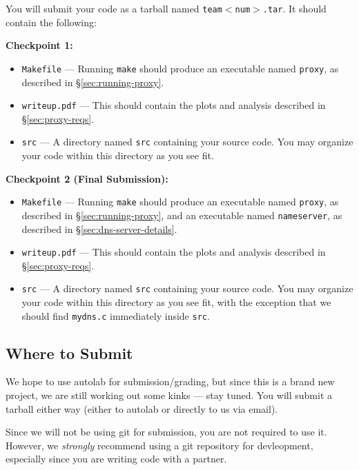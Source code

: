 \documentclass{article}
\begin{document}
You will submit your code as a tarball named \texttt{team$<$num$>$.tar}. It
should contain the following:

\medskip \noindent \textbf{Checkpoint 1:}
\begin{itemize}
	\item \texttt{Makefile} --- Running \texttt{make} should produce an
	executable named \texttt{proxy}, as described in \S\ref{sec:running-proxy}.

	\item \texttt{writeup.pdf} --- This should contain the plots and analysis
	described in \S\ref{sec:proxy-reqs}. 

	\item \texttt{src} --- A directory named \texttt{src} containing your
	source code. You may organize your code within this directory as you see
	fit.
\end{itemize}


\medskip \noindent \textbf{Checkpoint 2 (Final Submission):}
\begin{itemize}
	\item \texttt{Makefile} --- Running \texttt{make} should produce an
	executable named \texttt{proxy}, as described in \S\ref{sec:running-proxy},
	and an executable named \texttt{nameserver}, as described in
	\S\ref{sec:dns-server-details}.

	\item \texttt{writeup.pdf} --- This should contain the plots and analysis
	described in \S\ref{sec:proxy-reqs}. 

	\item \texttt{src} --- A directory named \texttt{src} containing your
	source code. You may organize your code within this directory as you see
	fit, with the exception that we should find \texttt{mydns.c} immediately
	inside \texttt{src}.
\end{itemize}


\subsection{Where to Submit}

We hope to use autolab for submission/grading, but since this is a brand new
project, we are still working out some kinks --- stay tuned. You will submit a
tarball either way (either to autolab or directly to us via email).

Since we will not be using git for submission, you are not required to use it.
However, we \emph{strongly} recommend using a git repository for devleopment,
especially since you are writing code with a partner.
\end{document}
